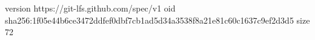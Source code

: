 version https://git-lfs.github.com/spec/v1
oid sha256:1f05e44b6ce3472ddfef0dbf7cb1ad5d34a3538f8a21e81c60c1637c9ef2d3d5
size 72
